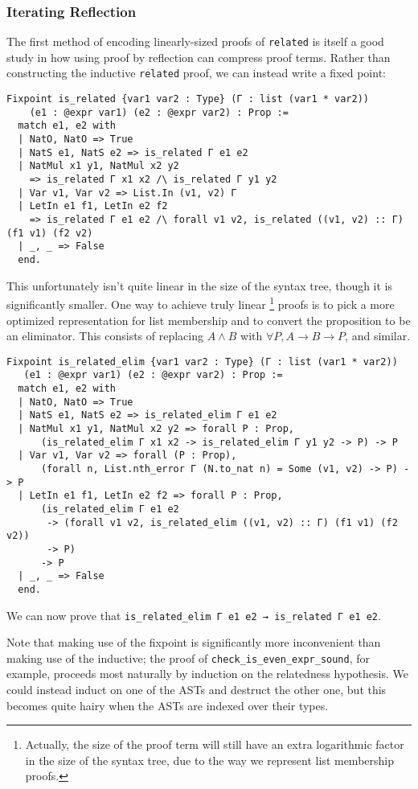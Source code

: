 \subsubsection{Iterating Reflection} \label{sec:wf:perf:reflective}

The first method of encoding linearly-sized proofs of \texttt{related} is itself a good study in how using proof by reflection can compress proof terms.
Rather than constructing the inductive \texttt{related} proof, we can instead write a fixed point:
\begin{verbatim}
Fixpoint is_related {var1 var2 : Type} (Γ : list (var1 * var2))
    (e1 : @expr var1) (e2 : @expr var2) : Prop :=
  match e1, e2 with
  | NatO, NatO => True
  | NatS e1, NatS e2 => is_related Γ e1 e2
  | NatMul x1 y1, NatMul x2 y2
    => is_related Γ x1 x2 /\ is_related Γ y1 y2
  | Var v1, Var v2 => List.In (v1, v2) Γ
  | LetIn e1 f1, LetIn e2 f2
    => is_related Γ e1 e2 /\ forall v1 v2, is_related ((v1, v2) :: Γ) (f1 v1) (f2 v2)
  | _, _ => False
  end.
\end{verbatim}
This unfortunately isn't quite linear in the size of the syntax tree, though it is significantly smaller.
One way to achieve truly linear%
\footnote{%
Actually, the size of the proof term will still have an extra logarithmic factor in the size of the syntax tree, due to the way we represent list membership proofs.%
}
proofs is to pick a more optimized representation for list membership and to convert the proposition to be an eliminator.
This consists of replacing $A \wedge B$ with $\forall P, A \to B \to P$, and similar.
\begin{verbatim}
Fixpoint is_related_elim {var1 var2 : Type} (Γ : list (var1 * var2))
   (e1 : @expr var1) (e2 : @expr var2) : Prop :=
  match e1, e2 with
  | NatO, NatO => True
  | NatS e1, NatS e2 => is_related_elim Γ e1 e2
  | NatMul x1 y1, NatMul x2 y2 => forall P : Prop,
      (is_related_elim Γ x1 x2 -> is_related_elim Γ y1 y2 -> P) -> P
  | Var v1, Var v2 => forall (P : Prop),
      (forall n, List.nth_error Γ (N.to_nat n) = Some (v1, v2) -> P) -> P
  | LetIn e1 f1, LetIn e2 f2 => forall P : Prop,
      (is_related_elim Γ e1 e2
       -> (forall v1 v2, is_related_elim ((v1, v2) :: Γ) (f1 v1) (f2 v2))
       -> P)
      -> P
  | _, _ => False
  end.
\end{verbatim}
We can now prove that \texttt{is_related_elim Γ e1 e2 → is_related Γ e1 e2}.

Note that making use of the fixpoint is significantly more inconvenient than making use of the inductive; the proof of \texttt{check_is_even_expr_sound}, for example, proceeds most naturally by induction on the relatedness hypothesis.
We could instead induct on one of the ASTs and destruct the other one, but this becomes quite hairy when the ASTs are indexed over their types.

